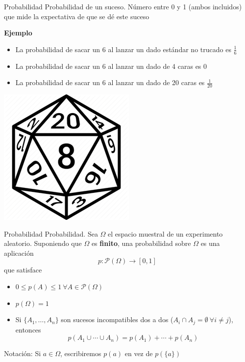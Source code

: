 \documentclass[
  ignorenonframetext,
]{beamer}
\providecommand{\tightlist}{%
  \setlength{\itemsep}{0pt}\setlength{\parskip}{0pt}}
\begin{document}
\begin{frame}{Probabilidad}
\protect\hypertarget{probabilidad}{}
Probabilidad de un suceso. Número entre 0 y 1 (ambos incluidos) que mide
la expectativa de que se dé este suceso

\textbf{Ejemplo}

\begin{itemize}
\tightlist
\item
  La probabilidad de sacar un 6 al lanzar un dado estándar no trucado es
  \(\frac{1}{6}\)
\item
  La probabilidad de sacar un 6 al lanzar un dado de 4 caras es \(0\)
\item
  La probabilidad de sacar un 6 al lanzar un dado de 20 caras es
  \(\frac{1}{20}\)
\end{itemize}

\includegraphics{Imgs/dado.png}
\end{frame}

\begin{frame}{Probabilidad}
\protect\hypertarget{probabilidad-1}{}
Probabilidad. Sea \(\Omega\) el espacio muestral de un experimento
aleatorio. Suponiendo que \(\Omega\) es \textbf{finito}, una
probabilidad sobre \(\Omega\) es una aplicación
\[p: \mathcal{P}(\Omega)\longrightarrow [0,1]\] que satisface

\begin{itemize}
\tightlist
\item
  \(0\le p(A)\le 1 \ \forall A\in\mathcal{P}(\Omega)\)
\item
  \(p(\Omega) = 1\)
\item
  Si \(\{A_1,\dots,A_n\}\) son sucesos incompatibles dos a dos
  (\(A_i\cap A_j=\emptyset \ \forall i\ne j\)), entonces
  \[p(A_1\cup\cdots \cup A_n)=p(A_1)+\cdots+p(A_n)\]
\end{itemize}

Notación: Si \(a\in\Omega\), escribiremos \(p(a)\) en vez de
\(p(\{a\})\)
\end{frame}
\end{document}
